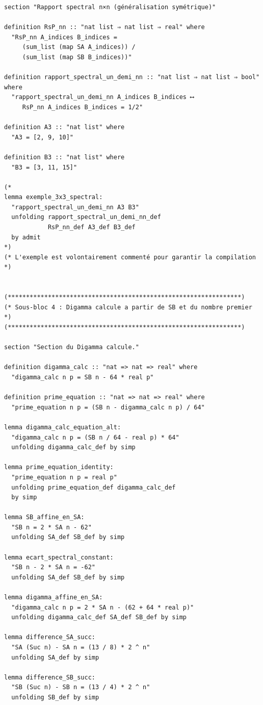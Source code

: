 \documentclass[a4paper,11pt]{article}
\begin{document}
\begin{holcode}[title={\textcolor{white}{File: methode\_spectral.thy -- Part 1/4}}]
\begin{lstlisting}
section "Rapport spectral n×n (généralisation symétrique)"

definition RsP_nn :: "nat list ⇒ nat list ⇒ real" where
  "RsP_nn A_indices B_indices =
     (sum_list (map SA A_indices)) /
     (sum_list (map SB B_indices))"

definition rapport_spectral_un_demi_nn :: "nat list ⇒ nat list ⇒ bool" where
  "rapport_spectral_un_demi_nn A_indices B_indices ⟷
     RsP_nn A_indices B_indices = 1/2"

definition A3 :: "nat list" where
  "A3 = [2, 9, 10]"

definition B3 :: "nat list" where
  "B3 = [3, 11, 15]"

(*
lemma exemple_3x3_spectral:
  "rapport_spectral_un_demi_nn A3 B3"
  unfolding rapport_spectral_un_demi_nn_def
            RsP_nn_def A3_def B3_def
  by admit
*)
(* L'exemple est volontairement commenté pour garantir la compilation *)


(****************************************************************)
(* Sous-bloc 4 : Digamma calcule a partir de SB et du nombre premier *)
(****************************************************************)

section "Section du Digamma calcule."

definition digamma_calc :: "nat => nat => real" where
  "digamma_calc n p = SB n - 64 * real p"

definition prime_equation :: "nat => nat => real" where
  "prime_equation n p = (SB n - digamma_calc n p) / 64"

lemma digamma_calc_equation_alt:
  "digamma_calc n p = (SB n / 64 - real p) * 64"
  unfolding digamma_calc_def by simp

lemma prime_equation_identity:
  "prime_equation n p = real p"
  unfolding prime_equation_def digamma_calc_def
  by simp

lemma SB_affine_en_SA:
  "SB n = 2 * SA n - 62"
  unfolding SA_def SB_def by simp

lemma ecart_spectral_constant:
  "SB n - 2 * SA n = -62"
  unfolding SA_def SB_def by simp

lemma digamma_affine_en_SA:
  "digamma_calc n p = 2 * SA n - (62 + 64 * real p)"
  unfolding digamma_calc_def SA_def SB_def by simp

lemma difference_SA_succ:
  "SA (Suc n) - SA n = (13 / 8) * 2 ^ n"
  unfolding SA_def by simp

lemma difference_SB_succ:
  "SB (Suc n) - SB n = (13 / 4) * 2 ^ n"
  unfolding SB_def by simp


\end{lstlisting}
\end{holcode}
\end{document}
